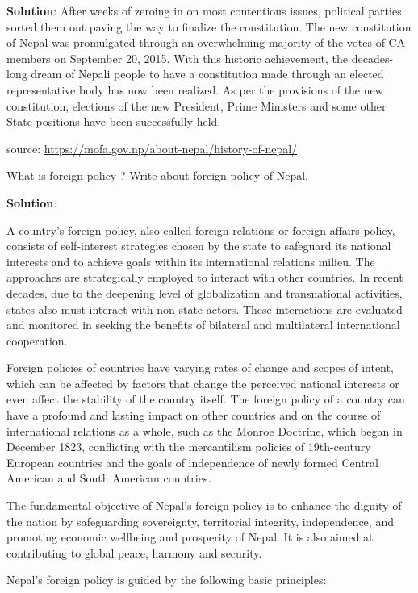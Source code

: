 \documentclass[
  openany]{book}
\newcommand{\question}{\item}
\newenvironment{solution}{ {\bfseries Solution}:}{}
\begin{document}
\begin{questions}
\begin{solution}
After weeks of zeroing in on most contentious issues, political parties sorted them out paving the way to finalize the constitution. The new constitution of Nepal was promulgated through an overwhelming majority of the votes of CA members on September 20, 2015. With this historic achievement, the decades-long dream of Nepali people to have a constitution made through an elected representative body has now been realized. As per the provisions of the new constitution, elections of the new President, Prime Ministers and some other State positions have been successfully held.

source: \url{https://mofa.gov.np/about-nepal/history-of-nepal/}
\end{solution}

\question What is foreign policy ? Write about foreign policy of Nepal.

\begin{solution}

A country's foreign policy, also called foreign relations or foreign affairs policy, consists of self-interest strategies chosen by the state to safeguard its national interests and to achieve goals within its international relations milieu. The approaches are strategically employed to interact with other countries. In recent decades, due to the deepening level of globalization and transnational activities, states also must interact with non-state actors. These interactions are evaluated and monitored in seeking the benefits of bilateral and multilateral international cooperation. 

Foreign policies of countries have varying rates of change and scopes of intent, which can be affected by factors that change the perceived national interests or even affect the stability of the country itself. The foreign policy of a country can have a profound and lasting impact on other countries and on the course of international relations as a whole, such as the Monroe Doctrine, which began in December 1823, conflicting with the mercantilism policies of 19th-century European countries and the goals of independence of newly formed Central American and South American countries.

The fundamental objective of Nepal's foreign policy is to enhance the dignity of the nation by safeguarding sovereignty, territorial integrity, independence, and promoting economic wellbeing and prosperity of Nepal. It is also aimed at contributing to global peace, harmony and security.

Nepal's foreign policy is guided by the following basic principles:


\end{solution}
\end{questions}
\end{document}
